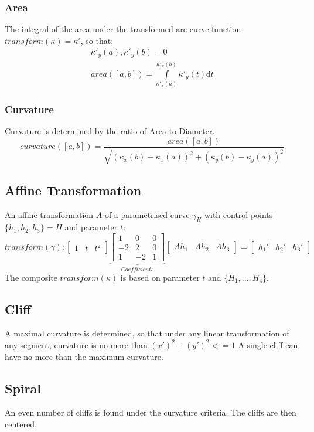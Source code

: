 \documentclass{article}
\begin{document}
\subsubsection{Area}
The integral of the area under the transformed arc curve function $transform(\kappa) = \kappa'$, so that:
\begin{align}
\kappa'_{y}(a), \kappa'_{y}(b) = 0\\
area([a,b])= \int \limits _{\kappa'_{x}(a)}^{\kappa'_{x}(b)} \kappa'_{y}(t)\mathrm{d}t
\end{align}

\subsubsection{Curvature}
Curvature is determined by the ratio of Area to Diameter.
\begin{equation}
curvature([a,b]) = \frac{area([a,b])}{\sqrt{(\kappa_{x}(b) - \kappa_{x}(a))^2+(\kappa_{y}(b) - \kappa_{y}(a))^2}}
\end{equation}

\subsection{Affine Transformation}
An affine transformation $A$ of a parametrised curve $\gamma_{H}$ with control points $\{h_{1},h_{2},h_{3}\} = H$ and parameter $t$:
\begin{equation}
transform(\gamma):
\begin{bmatrix}
1 & t & t^2
\end{bmatrix}
\underbrace{\begin{bmatrix}
1 & 0 & 0\\
-2 & 2 & 0\\
1 & -2 &1
\end{bmatrix}}_{Coefficients}
\begin{bmatrix}
Ah_{1} & Ah_{2} & Ah_{3}
\end{bmatrix}
=
\begin{bmatrix}
h_{1}' & h_{2}' & h_{3}'
\end{bmatrix}
\end{equation}
The composite $transform(\kappa)$ is based on parameter $t$ and $\{H_{1}, ... ,H_{4}\}$.

\subsection{Cliff}
A maximal curvature is determined, so that under any linear transformation of any segment, curvature is no more than $(x')^2 + (y')^2 <=1$
A single cliff can have no more than the maximum curvature.

\subsection{Spiral}
An even number of cliffs is found under the curvature criteria.
The cliffs are then centered.


\iffalse
\begin{equation} 
\forall u,v \in V :
d(u,v) = 
\begin{cases}
0,  u=v \\
1,  u \neq v 
\end{cases}
\end{equation}
\fi

\printbibliography
\end{document}
